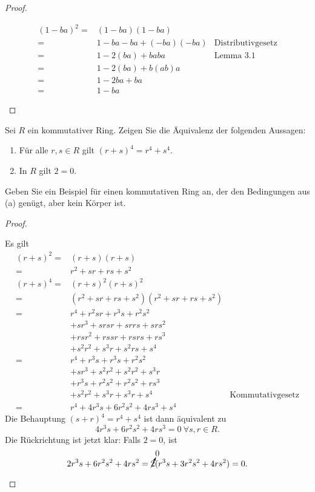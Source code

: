 \begin{proof}
	\begin{parts}
	\item 
		\begin{align*}
			(1-ba)^2=&(1-ba)(1-ba)\\
			=&1-ba-ba+(-ba)(-ba) & \text{Distributivgesetz}\\
			=&1-2(ba) + baba &\text{Lemma 3.1}\\
			=&1-2(ba)+b(ab)a\\
			=&1-2ba+ba\\
			=&1-ba
		\end{align*}
	\end{parts}
\end{proof}
\begin{Problem}
\begin{parts}
\item Sei $R$ ein kommutativer Ring. Zeigen Sie die Äquivalenz der folgenden Aussagen:
	\begin{enumerate}[label=(\arabic*)]
		\item F\"{u}r alle $r,s\in R$ gilt $(r+s)^4=r^4+s^4$.
		\item In $R$ gilt $2=0$.
	\end{enumerate}
\item Geben Sie ein Beispiel für einen kommutativen Ring an, der den Bedingungen aus (a) genügt, aber kein Körper ist. 
\end{parts}
\end{Problem}
\begin{proof}
	\begin{parts}
	\item Es gilt
		\begin{align*}
			(r+s)^2=&(r+s)(r+s)\\
			=&r^2+s r+rs+s^2\\
			(r+s)^4=&(r+s)^2(r+s)^2\\
			=&(r^2+s r+rs+s^2)(r^2+s r+rs+s^2)\\
			=&r^4+r^2 s r+r^3 s + r^2s^2\\
			 &+s r^3+s r s r+s r r s+s r s^2\\
			 &+r s r^2+rss r+rs rs+ rs^3\\
			 &+s^2r^2+s^3 r+s^2 rs+s^4\\
			=&r^4 + r^3s+r^3s+r^2s^2\\
			 &+s r^3+ s^2r^2 + s^2 r^2 + s^3 r\\
			 &+r^3 s + r^2 s^2+ r^2 s^2 + r s^3\\
			 &+s^2r^2 + s^3 r + s^3 r + s^4 & \text{Kommutativgesetz}\\
			=&r^4+4r^3 s+6r^2 s^2+4r s^3+s^4
		\end{align*}
		Die Behauptung $(s+r)^4=r^4+s^4$ ist dann äquivalent zu
		\[
		4r^3s+6r^2s^2+4rs^3=0~\forall s,r\in R
		.\] 
		Die Rückrichtung ist jetzt klar: Falls $2=0$, ist
		\[
			2r^3s+6r^2s^2+4rs^2=\cancelto{0}{2}(r^3s+3r^2s^2+4rs^2)=0
		.\] 
	\end{parts}
\end{proof}
